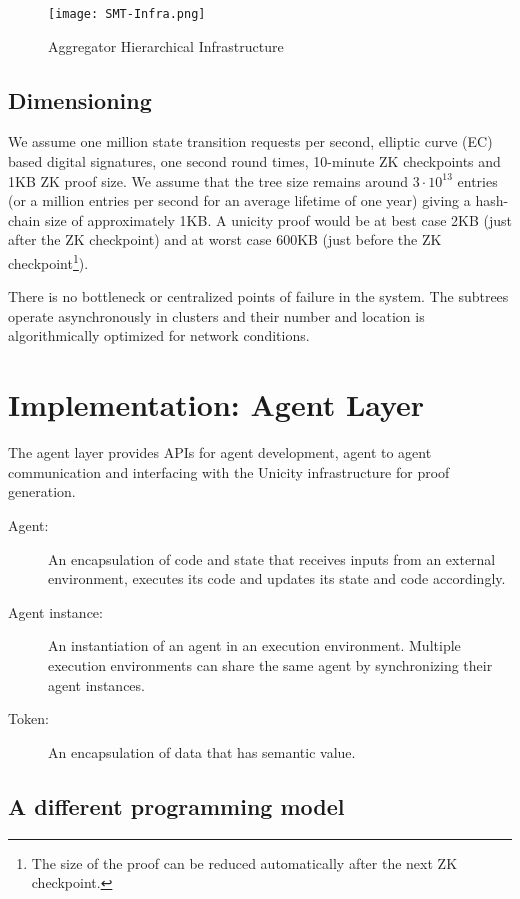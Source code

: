 \documentclass{article}
\begin{document}
\begin{figure}[htbp]
    \centering
    \texttt{[image: SMT-Infra.png]}
    \caption{Aggregator Hierarchical Infrastructure}
    \label{fig:SMT-Infra}
\end{figure}

\subsection{Dimensioning}

We assume one million state transition requests per second, elliptic curve (EC) based digital signatures, one second round times, 10-minute ZK checkpoints and 1\;KB ZK proof size. We assume that the tree size remains around $3 \cdot 10^{13}$ entries (or a million entries per second for an average lifetime of one year) giving a hash-chain size of approximately 1\;KB.
A unicity proof would be at best case 2\;KB (just after the ZK checkpoint) and at worst case 600\;KB (just before the ZK checkpoint\footnote{The size of the proof can be reduced automatically after the next ZK checkpoint.}).

There is no bottleneck or centralized points of failure in the system. The subtrees operate asynchronously in clusters and their number and location is algorithmically optimized for network conditions.

\section{Implementation: Agent Layer}

The agent layer provides APIs for agent development, agent to agent communication and interfacing with the Unicity infrastructure for proof generation.

\begin{description}
    \item[Agent:] An encapsulation of code and state that receives inputs from an external environment, executes its code and updates its state and code accordingly.
    \item[Agent instance:] An instantiation of an agent in an execution environment. Multiple execution environments can share the same agent by synchronizing their agent instances.
    \item[Token:] An encapsulation of data that has semantic value.
\end{description}


\subsection{A different programming model}
\end{document}
